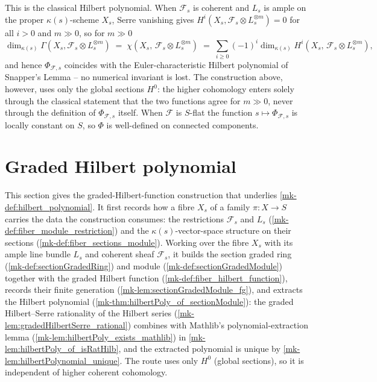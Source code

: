 \begin{definition}
  This is the classical Hilbert polynomial. When \(\mathcal{F}_s\) is coherent
  and \(L_s\) is ample on the proper \(\kappa(s)\)-scheme \(X_s\), Serre vanishing
  gives \(H^i(X_s, \mathcal{F}_s \otimes L_s^{\otimes m}) = 0\) for all \(i > 0\)
  and \(m \gg 0\), so for \(m \gg 0\)
  \[
    \dim_{\kappa(s)} \Gamma(X_s, \mathcal{F}_s \otimes L_s^{\otimes m})
    \;=\; \chi(X_s,\, \mathcal{F}_s \otimes L_s^{\otimes m})
    \;=\; \sum_{i \ge 0} (-1)^i \dim_{\kappa(s)} H^i(X_s,\, \mathcal{F}_s \otimes L_s^{\otimes m}),
  \]
  and hence \(\Phi_{\mathcal{F},s}\) coincides with the Euler-characteristic
  Hilbert polynomial of Snapper's Lemma -- no numerical invariant is lost. The
  construction above, however, uses only the global sections \(H^0\): the higher
  cohomology enters solely through the classical statement that the two functions
  agree for \(m \gg 0\), never through the definition of \(\Phi_{\mathcal{F},s}\)
  itself. When \(\mathcal{F}\) is \(S\)-flat the function
  \(s \mapsto \Phi_{\mathcal{F},s}\) is locally constant on \(S\), so \(\Phi\) is
  well-defined on connected components.
\end{definition}

\section{Graded Hilbert polynomial}
\label{mk-sec:graded_hilbert_polynomial}

This section gives the graded-Hilbert-function construction that underlies
\ref{mk-def:hilbert_polynomial}. It first records how a fibre \(X_s\) of a
family \(\pi : X \to S\) carries the data the construction consumes: the
restrictions \(\mathcal{F}_s\) and \(L_s\)
(\ref{mk-def:fiber_module_restriction}) and the \(\kappa(s)\)-vector-space
structure on their sections (\ref{mk-def:fiber_sections_module}). Working over
the fibre \(X_s\) with its ample line bundle \(L_s\) and coherent sheaf
\(\mathcal{F}_s\), it builds the section graded ring
(\ref{mk-def:sectionGradedRing}) and module (\ref{mk-def:sectionGradedModule})
together with the graded Hilbert function
(\ref{mk-def:fiber_hilbert_function}), records their finite generation
(\ref{mk-lem:sectionGradedModule_fg}), and extracts the Hilbert polynomial
(\ref{mk-thm:hilbertPoly_of_sectionModule}): the graded Hilbert--Serre
rationality of the Hilbert series (\ref{mk-lem:gradedHilbertSerre_rational})
combines with Mathlib's polynomial-extraction lemma
(\ref{mk-lem:hilbertPoly_exists_mathlib}) in \ref{mk-lem:hilbertPoly_of_isRatHilb},
and the extracted polynomial is unique by
\ref{mk-lem:hilbertPolynomial_unique}. The route uses only \(H^0\)
(global sections), so it is independent of higher coherent cohomology.


